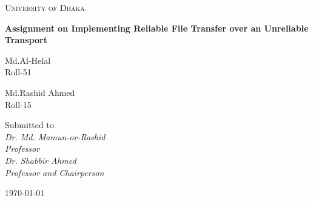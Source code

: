 \documentclass[12pt,a4paper]{report}
\begin{document}
\begin{titlepage}
\centering
{\scshape\LARGE University of Dhaka \par}
\vspace{1.5cm}
{\huge\bfseries Assignment on Implementing Reliable File Transfer over an Unreliable Transport\par}
\vspace{3cm}
{\Large\itshape \parbox{5cm}{\centering Md.Al-Helal\\Roll-51}\hspace{1cm}\parbox{6cm}{\centering Md.Rashid Ahmed\\Roll-15}}
\vfill
Submitted to\\
\vspace{0.5cm}
{\itshape Dr. Md. Mamun-or-Rashid \\ Professor\vspace{0.3cm} \\Dr. Shabbir Ahmed \\Professor and Chairperson}
\vfill
{\large \today\par}
\end{titlepage}
\end{document}
